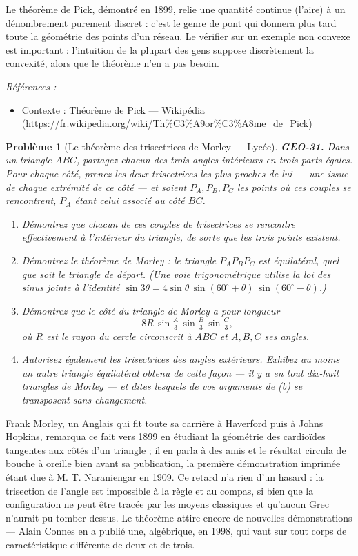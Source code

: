 \documentclass[11pt]{article}
\newtheorem{problem}{Problème}
\newenvironment{refs}{\par\small\noindent\emph{Références :}\begin{itemize}\setlength\itemsep{0pt}}{\end{itemize}\normalsize}
\begin{document}
\noindent Le théorème de Pick, démontré en 1899, relie une quantité continue (l'aire) à un dénombrement purement discret : c'est le genre de pont qui donnera plus tard toute la géométrie des points d'un réseau. Le vérifier sur un exemple non convexe est important : l'intuition de la plupart des gens suppose discrètement la convexité, alors que le théorème n'en a pas besoin.

\begin{refs}
\item Contexte : Théorème de Pick --- Wikipédia (\url{https://fr.wikipedia.org/wiki/Th%C3%A9or%C3%A8me_de_Pick})
\end{refs}

\bigskip

\begin{problem}[{Le théorème des trisectrices de Morley --- Lycée}]
\textbf{GEO-31.} Dans un triangle $ ABC $, partagez chacun des trois angles intérieurs en trois
parts égales. Pour chaque côté, prenez les deux trisectrices les plus proches de lui --- une issue de
chaque extrémité de ce côté --- et soient $ P_A, P_B, P_C $ les points où ces couples se rencontrent,
$ P_A $ étant celui associé au côté $ BC $.
\begin{enumerate}
\item[(a)] Démontrez que chacun de ces couples de trisectrices se rencontre effectivement à l'intérieur du
triangle, de sorte que les trois points existent.
\item[(b)] Démontrez le théorème de Morley : le triangle $ P_A P_B P_C $ est équilatéral, quel que soit le
triangle de départ. (Une voie trigonométrique utilise la loi des sinus jointe à l'identité
$ \sin 3\theta = 4 \sin\theta \, \sin(60^\circ + \theta) \, \sin(60^\circ - \theta) $.)
\item[(c)] Démontrez que le côté du triangle de Morley a pour longueur
\[ 8R \, \sin\tfrac{A}{3} \, \sin\tfrac{B}{3} \, \sin\tfrac{C}{3} , \]
où $ R $ est le rayon du cercle circonscrit à $ ABC $ et $ A, B, C $ ses angles.
\item[(d)] Autorisez également les trisectrices des angles \textit{extérieurs}. Exhibez au moins un autre
triangle équilatéral obtenu de cette façon --- il y a en tout dix-huit triangles de Morley --- et dites
lesquels de vos arguments de (b) se transposent sans changement.
\end{enumerate}

\end{problem}

\noindent Frank Morley, un Anglais qui fit toute sa carrière à Haverford puis à Johns Hopkins,
remarqua ce fait vers 1899 en étudiant la géométrie des cardioïdes tangentes aux côtés d'un triangle ;
il en parla à des amis et le résultat circula de bouche à oreille bien avant sa publication, la
première démonstration imprimée étant due à M. T. Naraniengar en 1909. Ce retard n'a rien d'un
hasard : la trisection de l'angle est impossible à la règle et au compas, si bien que la configuration
ne peut être tracée par les moyens classiques et qu'aucun Grec n'aurait pu tomber dessus. Le théorème
attire encore de nouvelles démonstrations --- Alain Connes en a publié une, algébrique, en 1998, qui
vaut sur tout corps de caractéristique différente de deux et de trois.
\end{document}
